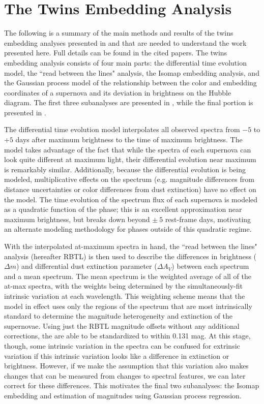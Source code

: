 \section{The Twins Embedding Analysis} \label{sec:boone_summary}
The following is a summary of the main methods and results of the twins embedding analyses presented in  and  that are needed to understand the work presented here. Full details can be found in the cited papers. The twins embedding analysis consists of four main parts: the differential time evolution model, the ``read between the lines" analysis, the Isomap embedding analysis, and the Gaussian process model of the relationship between the color and embedding coordinates of a supernova and its deviation in brightness on the Hubble diagram. The first three subanalyses are presented in , while the final portion is presented in .

The differential time evolution model interpolates all observed spectra from $-5$ to $+5$ days after maximum brightness to the time of maximum brightness. The model takes advantage of the fact that while the spectra of each supernova can look quite different at maximum light, their differential evolution near maximum is remarkably similar. Additionally, because the differential evolution is being modeled, multiplicative effects on the spectrum (e.g. magnitude differences from distance uncertainties or color differences from dust extinction) have no effect on the model. The time evolution of the spectrum flux of each supernova is modeled as a quadratic function of the phase; this is an excellent approximation near maximum brightness, but breaks down beyond $\pm~5$ rest-frame days, motivating an alternate modeling methodology for phases outside of this quadratic regime.

With the interpolated at-maximum spectra in hand, the ``read between the lines" analysis (hereafter RBTL) is then used to describe the differences in brightness ($\Delta m$) and differential dust extinction parameter ($\Delta A_V$) between each spectrum and a mean spectrum. The mean spectrum is the weighted average of all of the at-max spectra, with the weights being determined by the simultaneously-fit intrinsic variation at each wavelength. This weighting scheme means that the model in effect uses only the regions of the spectrum that are most intrinsically standard to determine the magnitude heterogeneity and extinction of the supernovae. Using just the RBTL magnitude offsets without any additional corrections, the \sne{} are able to be standardized to within 0.131 mag. At this stage, though, some intrinsic variation in the spectra can be confused for extrinsic variation if this intrinsic variation looks like a difference in extinction or brightness. However, if we make the assumption that this variation also makes changes that can be measured from changes to spectral features, we can later correct for these differences. This motivates the final two subanalyses: the Isomap embedding and estimation of magnitudes using Gaussian process regression.

